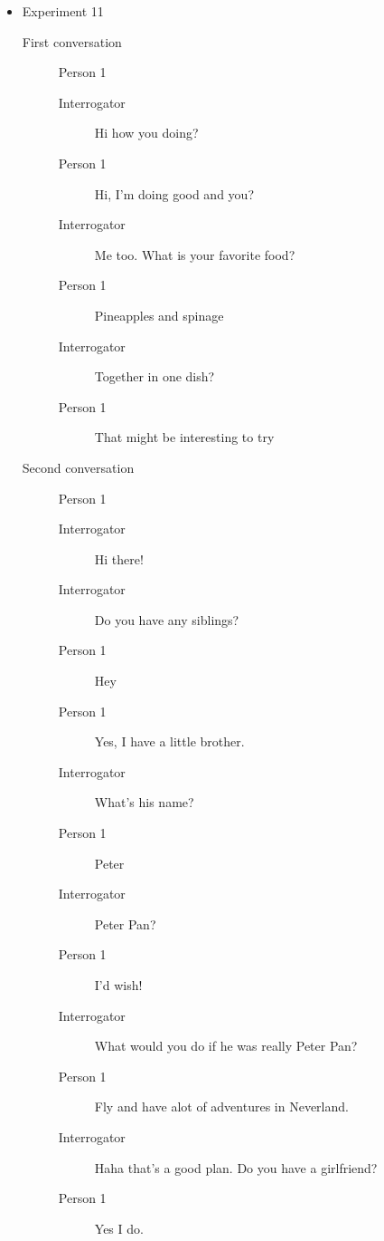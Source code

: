 \begin{itemize}
   \item Experiment 11
      \begin{description}
         \item [First conversation] Person 1
            \begin{description}
               \item [Interrogator] Hi how you doing?
               \item [Person 1] Hi, I'm doing good and you?
               \item [Interrogator] Me too. What is your favorite food?
               \item [Person 1] Pineapples and spinage
               \item [Interrogator] Together in one dish?
               \item [Person 1] That might be interesting to try
            \end{description}
         \item [Second conversation] Person 1
            \begin{description}
               \item [Interrogator] Hi there!
               \item [Interrogator] Do you have any siblings?
               \item [Person 1] Hey
               \item [Person 1] Yes, I have a little brother.
               \item [Interrogator] What's his name?
               \item [Person 1] Peter
               \item [Interrogator] Peter Pan?
               \item [Person 1] I'd wish!
               \item [Interrogator] What would you do if he was really Peter Pan?
               \item [Person 1] Fly and have alot of adventures in Neverland.
               \item [Interrogator] Haha that's a good plan. Do you have a girlfriend?
               \item [Person 1] Yes I do.
            \end{description}
      \end{description}


\end{itemize}
